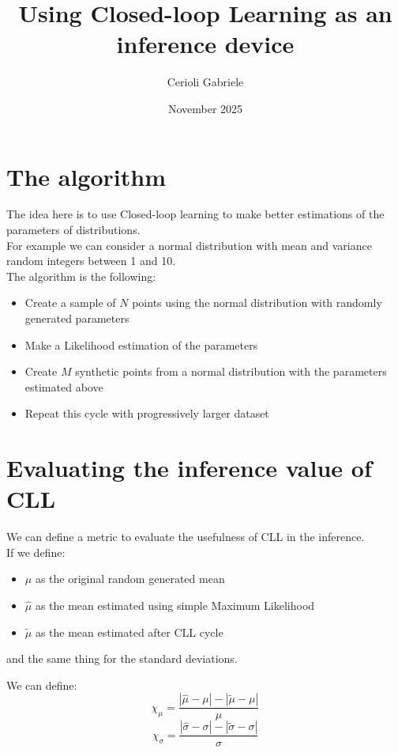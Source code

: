\documentclass[english]{article}
\title{Using Closed-loop Learning as an inference device}
\author{Cerioli Gabriele}
\date{November 2025}
\begin{document}
\maketitle
\section{The algorithm}
The idea here is to use Closed-loop learning to make better estimations of the parameters of distributions.\\

For example we can consider a normal distribution with mean and variance random integers between 1 and 10.\\

The algorithm is the following:
\begin{itemize}
    \item Create a sample of $N$ points using the normal distribution with randomly generated parameters
    \item Make a Likelihood estimation of the parameters
    \item Create $M$ synthetic points from a normal distribution with the parameters estimated above
    \item Repeat this cycle with progressively larger dataset
\end{itemize}

\section{Evaluating the inference value of CLL}

We can define a metric to evaluate the usefulness of CLL in the inference.\\

If we define:
\begin{itemize}
    \item $\mu$ as the original random generated mean
    \item $\hat{\mu}$ as the mean estimated using simple Maximum Likelihood
    \item $\tilde{\mu}$ as the mean estimated after CLL cycle
\end{itemize}
and the same thing for the standard deviations.

We can define:
\begin{equation*}
    \chi_{\mu}=\frac{\left|\hat{\mu}-\mu  \right|-\left| \tilde{\mu} -\mu \right|}{\mu}
\end{equation*}
\begin{equation*}
    \chi_{\sigma}=\frac{\left|\hat{\sigma}-\sigma  \right|-\left| \tilde{\sigma} -\sigma \right|}{\sigma}
\end{equation*}
\end{document}
